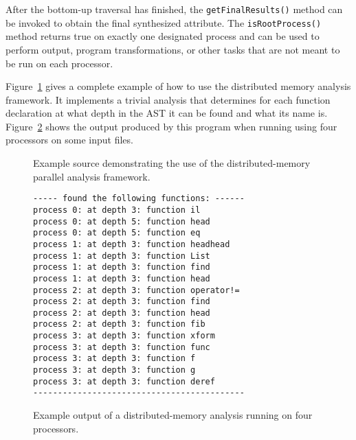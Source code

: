     After the bottom-up traversal has finished, the {\tt getFinalResults()} method can be invoked to obtain the final
synthesized attribute. The {\tt isRootProcess()} method returns true on exactly one designated process and can be used
to perform output, program transformations, or other tasks that are not meant to be run on each processor.

    Figure~\ref{Tutorial:exampleDistributedMemoryTraversals} gives a complete example of how to use the distributed
memory analysis framework. It implements a trivial analysis that determines for each function declaration at what depth
in the AST it can be found and what its name is. Figure~\ref{Tutorial:exampleOutput_DistributedMemoryTraversals} shows
the output produced by this program when running using four processors on some input files.

\begin{figure}[!h]
{\indent
{\mySmallFontSize
\begin{latexonly}
   
\end{latexonly}
\begin{htmlonly}
   
\end{htmlonly}
}
}
\caption{Example source demonstrating the use of the distributed-memory parallel analysis framework.}
\label{Tutorial:exampleDistributedMemoryTraversals}
\end{figure}
\begin{figure}[!h]
{\indent
{\mySmallFontSize
\begin{verbatim}
----- found the following functions: ------
process 0: at depth 3: function il
process 0: at depth 5: function head
process 0: at depth 5: function eq
process 1: at depth 3: function headhead
process 1: at depth 3: function List
process 1: at depth 3: function find
process 1: at depth 3: function head
process 2: at depth 3: function operator!=
process 2: at depth 3: function find
process 2: at depth 3: function head
process 2: at depth 3: function fib
process 3: at depth 3: function xform
process 3: at depth 3: function func
process 3: at depth 3: function f
process 3: at depth 3: function g
process 3: at depth 3: function deref
-------------------------------------------
\end{verbatim}
}
}
\caption{Example output of a distributed-memory analysis running on four processors.}
\label{Tutorial:exampleOutput_DistributedMemoryTraversals}
\end{figure}
